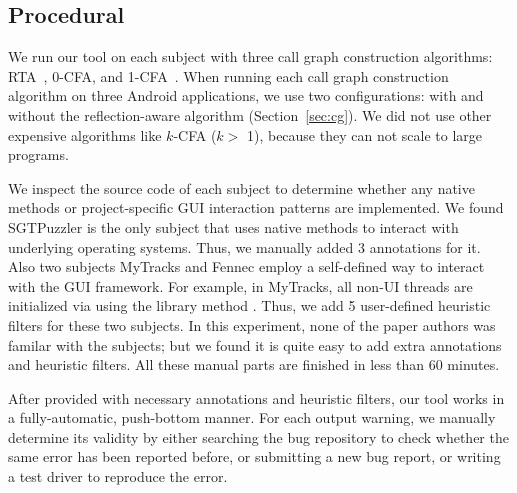 \subsection{Procedural}
\label{sec:procedural}

We run our tool on each subject with three call graph construction
algorithms: RTA~\cite{rta}, 0-CFA, and 1-CFA~\cite{kcfa}.  When running
each call graph construction algorithm on three Android applications, we
use two configurations: with and without the reflection-aware algorithm 
(Section~\ref{sec:cg}).  We did not use other expensive algorithms like $k$-CFA ($k >$ 1),
because they can not scale to large programs.

We inspect the source code of each subject to determine whether any
native methods or project-specific GUI interaction patterns are implemented.
We found SGTPuzzler is the only subject that uses native methods to interact with
underlying operating systems. Thus, we manually added 3 
annotations for it. Also two subjects MyTracks and Fennec employ a self-defined
way to interact with the GUI framework. For example, in MyTracks, all non-UI
threads are initialized via using the library method .
Thus, we add 5 user-defined heuristic filters for these two subjects.%
In this experiment, none of the paper
authors was familar with the subjects; but we found it is quite easy
to add extra annotations and heuristic filters. All these
manual parts are finished in less than 60 minutes.

After provided with necessary annotations and heuristic filters,
our tool works in a fully-automatic, push-bottom manner. For each output
warning, we manually determine its validity by either searching the
bug repository to check whether the same error has been reported before,
or submitting a new bug report, or writing a test driver to reproduce
the error.



